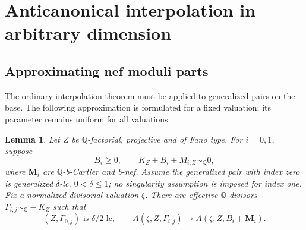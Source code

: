 \documentclass[11pt,reqno]{amsart}
\numberwithin{equation}{section}
\newtheorem{lemma}[theorem]{Lemma}
\theoremstyle{definition}
\theoremstyle{remark}
\newcommand{\Q}{\mathbb Q}
\newcommand{\simq}{\sim_{\Q}}
\newcommand{\bM}{\mathbf M}
\begin{document}
\section{Anticanonical interpolation in arbitrary dimension}\label{sec:interpolation}

\subsection{Approximating nef moduli parts}
The ordinary interpolation theorem must be applied to generalized pairs on the base. The following approximation is formulated for a fixed valuation; its parameter remains uniform for all valuations.

\begin{lemma}\label{lem:moduli}
Let $Z$ be $\Q$-factorial, projective and of Fano type. For $i=0,1$, suppose
\[
 B_i\ge0,\qquad K_Z+B_i+M_{i,Z}\simq0,
\]
where $\bM_i$ are $\Q$-b-Cartier and b-nef. Assume the generalized pair with index zero is generalized $\delta$-lc, $0<\delta\le1$; no singularity assumption is imposed for index one. Fix a normalized divisorial valuation $\zeta$. There are effective $\Q$-divisors $\Gamma_{i,j}\simq-K_Z$ such that
\[
 (Z,\Gamma_{0,j})\text{ is }\delta/2\text{-lc},
 \qquad A(\zeta,Z,\Gamma_{i,j})\longrightarrow
 A(\zeta,Z,B_i+\bM_i).
\]
\end{lemma}
\end{document}
